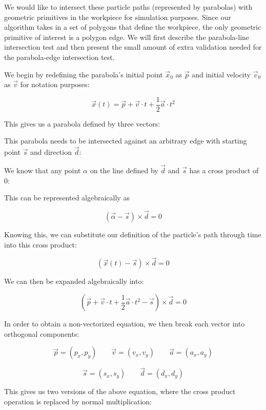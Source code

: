 We would like to intersect these particle paths (represented by parabolas) with geometric primitives in the workpiece for simulation purposes. Since our algorithm takes in a set of polygons that define the workpiece, the only geometric primitive of interest is a polygon edge. We will first describe the parabola-line intersection test and then present the small amount of extra validation needed for the parabola-edge intersection test.

We begin by redefining the parabola's initial point $\vec{x}_0$ as $\vec{p}$ and initial velocity $\vec{v}_0$ as $\vec{v}$ for notation purposes:

$$
\vec{x}(t) = \vec{p} + \vec{v} \cdot t + \frac{1}{2} \vec{a} \cdot t^2
$$

This gives us a parabola defined by three vectors:


This parabola needs to be intersected against an arbitrary edge with starting point $\vec{s}$ and direction $\vec{d}$:


We know that any point $\alpha$ on the line defined by $\vec{d}$ and $\vec{s}$ has a cross product of 0:


This can be represented algebraically as

$$
(\vec{\alpha} - \vec{s}) \times \vec{d} = 0
$$

Knowing this, we can substitute our definition of the particle's path through time into this cross product:

$$
(\vec{x}(t) - \vec{s}) \times \vec{d} = 0
$$

We can then be expanded algebraically into:

$$
(\vec{p} + \vec{v} \cdot t + \frac{1}{2} \vec{a} \cdot t^2 - \vec{s}) \times \vec{d} = 0
$$

In order to obtain a non-vectorized equation, we then break each vector into orthogonal components:

$$
\vec{p} = (p_x, p_y) \qquad \vec{v} = (v_x, v_y) \qquad \vec{a} = (a_x, a_y)
$$

$$
\vec{s} = (s_x, s_y) \qquad \vec{d} = (d_x, d_y)
$$

This gives us two versions of the above equation, where the cross product operation is replaced by normal multiplication:

